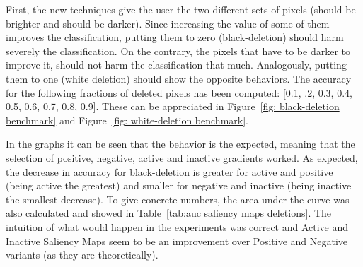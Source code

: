 \documentclass[preprint,12pt]{elsarticle}
\begin{document}
First, the new techniques give the user the two different sets of pixels (should be brighter and should be darker). Since increasing the value of some of them improves the classification, putting them to zero (black-deletion) should harm severely the classification. On the contrary, the pixels that have to be darker to improve it, should not harm the classification that much. Analogously, putting them to one (white deletion) should show the opposite behaviors. The accuracy for the following fractions of deleted pixels has been computed: [0.1, .2, 0.3, 0.4, 0.5, 0.6, 0.7, 0.8, 0.9]. These can be appreciated in Figure~\ref{fig: black-deletion benchmark} and Figure~\ref{fig: white-deletion benchmark}. 

In the graphs it can be seen that the behavior is the expected, meaning that the selection of positive, negative, active and inactive gradients worked. As expected, the decrease in accuracy for black-deletion is greater for active and positive (being active the greatest) and smaller for negative and inactive (being inactive the smallest decrease). To give concrete numbers, the area under the curve was also calculated and showed in Table~\ref{tab:auc saliency maps deletions}. The intuition of what would happen in the experiments was correct and Active and Inactive Saliency Maps seem to be an improvement over Positive and Negative variants (as they are theoretically).
\end{document}
